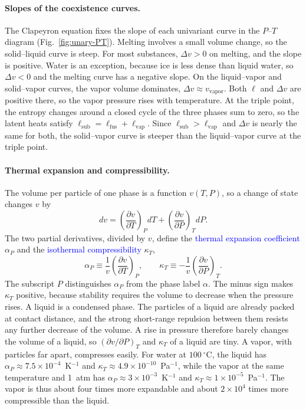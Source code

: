 \paragraph{Slopes of the coexistence curves.}
The Clapeyron equation fixes the slope of each univariant curve in the
$P$--$T$ diagram (Fig.~\ref{fig:unary-PT}). Melting involves a small volume
change, so the solid--liquid curve is steep. For most substances, $\Delta
v>0$ on melting, and the slope is positive. Water is an exception, because
ice is less dense than liquid water, so $\Delta v<0$ and the melting curve
has a negative slope. On the liquid--vapor and solid--vapor curves, the
vapor volume dominates, $\Delta v\approx v_{\text{vapor}}$. Both $\ell$ and
$\Delta v$ are positive there, so the vapor pressure rises with
temperature. At the triple point, the entropy changes around a closed cycle
of the three phases sum to zero, so the latent heats satisfy
$\ell_{\text{sub}}=\ell_{\text{fus}}+\ell_{\text{vap}}$. Since
$\ell_{\text{sub}}>\ell_{\text{vap}}$ and $\Delta v$ is nearly the same for
both, the solid--vapor curve is steeper than the liquid--vapor curve at the
triple point.

\paragraph{Thermal expansion and compressibility.}
The volume per particle of one phase is a function $v(T,P)$, so a change of
state changes $v$ by
\begin{equation}
    dv=\left(\frac{\partial v}{\partial T}\right)_{\!P}dT
      +\left(\frac{\partial v}{\partial P}\right)_{\!T}dP.
\end{equation}
The two partial derivatives, divided by $v$, define the
\textcolor{blue}{thermal expansion coefficient} $\alpha_P$ and the
\textcolor{blue}{isothermal compressibility} $\kappa_T$,
\begin{equation}
    \boxed{\alpha_P\equiv\frac{1}{v}\left(\frac{\partial v}{\partial T}\right)_{\!P},
    \qquad
    \kappa_T\equiv-\frac{1}{v}\left(\frac{\partial v}{\partial P}\right)_{\!T}.}
\end{equation}
The subscript $P$ distinguishes $\alpha_P$ from the phase label $\alpha$.
The minus sign makes $\kappa_T$ positive, because stability requires the
volume to decrease when the pressure rises. A liquid is a condensed phase.
The particles of a liquid are already packed at contact distance, and the
strong short-range repulsion between them resists any further decrease of
the volume. A rise in pressure therefore barely changes the volume of a
liquid, so $(\partial v/\partial P)_T$ and $\kappa_T$ of a liquid are tiny.
A vapor, with particles far apart, compresses easily. For water at $100~^\circ$C, the liquid has
$\alpha_P\approx7.5\times10^{-4}$~K$^{-1}$ and
$\kappa_T\approx4.9\times10^{-10}$~Pa$^{-1}$, while the vapor at the same
temperature and 1~atm has $\alpha_P\approx3\times10^{-3}$~K$^{-1}$ and
$\kappa_T\approx1\times10^{-5}$~Pa$^{-1}$. The vapor is thus about four
times more expandable and about $2\times10^{4}$ times more compressible than
the liquid.

